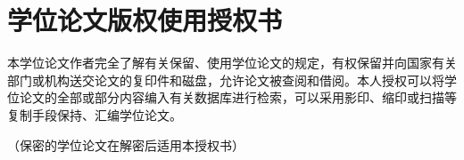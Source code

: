 
\chapter{学位论文版权使用授权书}
本学位论文作者完全了解{\universityname}有关保留、使用学位论文的规定，有权保留并向国家有关部门或机构送交论文的复印件和磁盘，允许论文被查阅和借阅。本人授权{\universityname}可以将学位论文的全部或部分内容编入有关数据库进行检索，可以采用影印、缩印或扫描等复制手段保持、汇编学位论文。

（保密的学位论文在解密后适用本授权书）
\vspace{4cm}
\autograph

